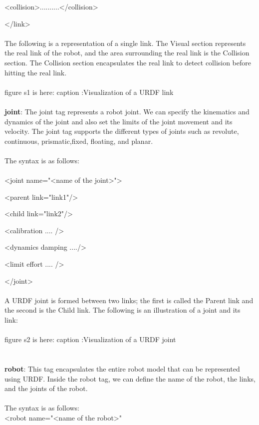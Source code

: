 \documentclass[a4paper]{article}
\begin{document}
  <collision>..........</collision>

</link>
\\\\The following is a representation of a single link. The Visual section represents 
the real link of the robot, and the area surrounding the real link is the Collision 
section. The Collision section encapsulates the real link to detect collision before 
hitting the real link.
\\\\figure s1 is here: caption :Visualization of a URDF link \\
\\\textbf{joint}: The joint tag represents a robot joint. We can specify the kinematics and dynamics of the joint and also set the limits of the joint movement and its velocity. The joint tag supports the different types of joints such as revolute, continuous, prismatic,fixed, floating, and planar.
\\\\The syntax is as follows:\\\\

<joint name="<name of the joint>">

  <parent link="link1"/>

  <child link="link2"/>

  <calibration .... />

  <dynamics damping ..../>

  <limit effort .... />

</joint>
\\\\A URDF joint is formed between two links; the first is called the Parent link and the second is the Child link. The following is an illustration of a joint and its link:
\\\\figure s2 is here: caption :Visualization of a URDF joint \\
\\\\\textbf{robot}: This tag encapsulates the entire robot model that can be represented using URDF. Inside the robot tag, we can define the name of the robot, the links, and the joints of the robot.
\\\\The syntax is as follows:\\

<robot name="<name of the robot>"
\end{document}
